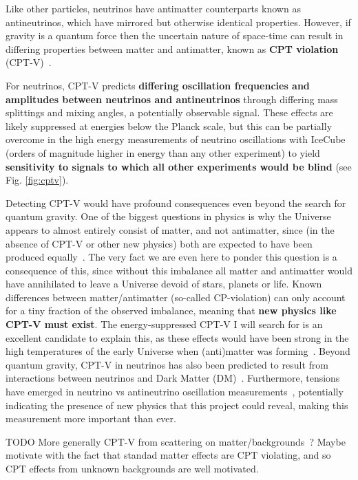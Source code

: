 \documentclass[a4paper,11pt]{article}
\begin{document}
Like other particles, neutrinos have antimatter counterparts known as antineutrinos, which have mirrored but otherwise identical properties. However, if gravity is a quantum force then the uncertain nature of space-time can result in differing properties between matter and antimatter, known as \textbf{CPT violation} (CPT-V)~\cite{Mavromatos:2005mi, AmelinoCamelia:2008qg, RalfLehnert:2016grl}. 

For neutrinos, CPT-V predicts \textbf{differing oscillation frequencies and amplitudes between neutrinos and antineutrinos} through differing mass splittings and mixing angles, a potentially observable signal. These effects are likely suppressed at energies below the Planck scale, but this can be partially overcome in the high energy measurements of neutrino oscillations with IceCube (orders of magnitude higher in energy than any other experiment) to yield \textbf{sensitivity to signals to which all other experiments would be blind} (see Fig. \ref{fig:cptv}). 

Detecting CPT-V would have profound consequences even beyond the search for quantum gravity. One of the biggest questions in physics is why the Universe appears to almost entirely consist of matter, and not antimatter, since (in the absence of CPT-V or other new physics) both are expected to have been produced equally~\cite{Sakharov_1991}. The very fact we are even here to ponder this question is a consequence of this, since without this imbalance all matter and antimatter would have annihilated to leave a Universe devoid of stars, planets or life. Known differences between matter/antimatter (so-called CP-violation) can only account for a tiny fraction of the observed imbalance, meaning that \textbf{new physics like CPT-V must exist}. The energy-suppressed CPT-V I will search for is an excellent candidate to explain this, as these effects would have been strong in the high temperatures of the early Universe when (anti)matter was forming~\cite{Mavromatos:2017cxr}. Beyond quantum gravity, CPT-V in neutrinos has also been predicted to result from interactions between neutrinos and Dark Matter (DM)~\cite{Capozzi:2018bps, 1904.02518}. Furthermore, tensions have emerged in neutrino vs antineutrino oscillation measurements~\cite{Abe:2019vii,NOvA_CP_result}, potentially indicating the presence of new physics that this project could reveal, making this measurement more important than ever.

TODO More generally CPT-V from scattering on matter/backgrounds~\cite{Capolupo:2020myw}? Maybe motivate with the fact that standad matter effects are CPT violating, and so CPT effects from unknown backgrounds are well motivated.
\end{document}
